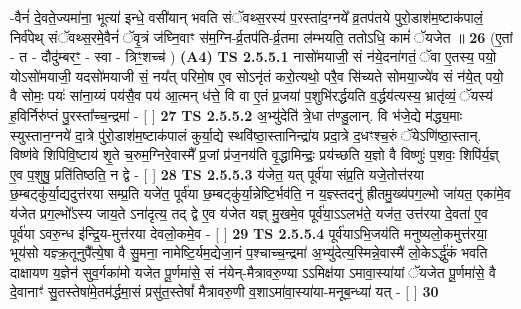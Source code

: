 \documentclass[17pt]{extarticle}
\begin{document}
                  -वैनं॑ दे॒वते॒ज्यमा॑ना॒ भूत्या॑ इन्धे॒ वसी॑यान् भवति संॅवथ्स॒रस्य॑ प॒रस्ता॑द॒ग्नये᳚ व्र॒तप॑तये पुरो॒डाश॑म॒ष्टाक॑पालं॒ निर्व॑पेथ् संॅवथ्स॒रमे॒वैनं॑ ॅवृ॒त्रं ज॑घ्नि॒वाꣳ स॑म॒ग्नि-र्व्र॒तप॑ति-र्व्र॒तमा ल॑म्भयति॒ ततोऽधि॒ कामं॑ ॅयजेत ॥ \textbf{  26 } \newline
                  \newline
                      (ए॒तां - त - दौदु॑म्बरꣳ॒॒ - स्वा - त्रिꣳ॒॒शच्च॑ ) \textbf{(A4)} \newline \newline
                                        \textbf{ TS 2.5.5.1} \newline
                  नासो॑मयाजी॒ सं न॑ये॒दना॑गतं॒ ॅवा ए॒तस्य॒ पयो॒ योऽसो॑मयाजी॒ यदसो॑मयाजी सं॒ नय᳚त् परिमो॒ष ए॒व सोऽनृ॑तं करो॒त्यथो॒ परै॒व सि॑च्यते सोमया॒ज्ये॑व सं न॑ये॒त् पयो॒ वै सोमः॒ पयः॑ सांना॒य्यं पय॑सै॒व पय॑ आ॒त्मन् ध॑त्ते॒ वि वा ए॒तं प्र॒जया॑ प॒शुभि॑रर्द्धयति व॒र्द्धय॑त्यस्य॒ भ्रातृ॑व्यं॒ ॅयस्य॑ ह॒विर्निरु॑प्तं पु॒रस्ता᳚च्च॒न्द्रमा॑ - [  ] \textbf{  27} \newline
                  \newline
                                \textbf{ TS 2.5.5.2} \newline
                  अ॒भ्यु॑देति॑ त्रे॒धा त॑ण्डु॒लान्. वि भ॑जे॒द्ये म॑द्ध्य॒माः स्युस्तान॒ग्नये॑ दा॒त्रे पु॑रो॒डाश॑म॒ष्टाक॑पालं कुर्या॒द्ये स्थवि॑ष्ठा॒स्तानिन्द्रा॑य प्रदा॒त्रे द॒धꣳश्च॒रुं ॅयेऽणि॑ष्ठा॒स्तान्. विष्ण॑वे शिपिवि॒ष्टाय॑ शृ॒ते च॒रुम॒ग्निरे॒वास्मै᳚ प्र॒जां प्र॑ज॒नय॑ति वृ॒द्धामिन्द्रः॒ प्रय॑च्छति य॒ज्ञो वै विष्णुः॑ प॒शवः॒ शिपि॑र्य॒ज्ञ् ए॒व प॒शुषु॒ प्रति॑तिष्ठति॒ न द्वे - [  ] \textbf{  28} \newline
                  \newline
                                \textbf{ TS 2.5.5.3} \newline
                  य॑जेत॒ यत् पूर्व॑या संप्र॒ति यजे॒तोत्त॑रया छ॒म्बट्कु॑र्या॒द्यदुत्त॑रया सम्प्र॒ति यजे॑त॒ पूर्व॑या छ॒म्बट्कु॑र्या॒न्नेष्टि॒र्भव॑ति॒ न य॒ज्ञ्स्तदनु॑ ह्रीतमु॒ख्य॑पग॒ल्भो जा॑यत॒ एका॑मे॒व य॑जेत प्रग॒ल्भो᳚ऽस्य जाय॒ते ऽना॑दृत्य॒ तद् द्वे ए॒व य॑जेत यज्ञ् मु॒खमे॒व पूर्व॑या॒ऽऽलभ॑ते॒ यज॑त॒ उत्त॑रया दे॒वता॑ ए॒व पूर्व॑या ऽवरु॒न्ध इ॑न्द्रि॒य-मुत्त॑रया देवलो॒कमे॒व - [  ] \textbf{  29} \newline
                  \newline
                                \textbf{ TS 2.5.5.4} \newline
                  पूर्व॑याऽभि॒जय॑ति मनुष्यलो॒कमुत्त॑रया॒ भूय॑सो यज्ञ्क्र॒तूनुपै᳚त्ये॒षा वै सु॒मना॒ नामेष्टि॒र्यम॒द्येजा॒नं प॒श्चाच्च॒न्द्रमा॑ अ॒भ्यु॑देत्य॒स्मिन्ने॒वास्मै॑ लो॒केऽर्द्धु॑कं भवति दाक्षायण य॒ज्ञेन॑ सुव॒र्गका॑मो यजेत पू॒र्णमा॑से॒ सं न॑येन्-मैत्रावरु॒ण्या ऽऽमिक्ष॑या ऽमावा॒स्या॑यां ॅयजेत पू॒र्णमा॑से॒ वै दे॒वानाꣳ॑ सु॒तस्तेषा॑मे॒तम॑र्द्धमा॒सं प्रसु॑त॒स्तेषां᳚ मैत्रावरु॒णी व॒शाऽमा॑वा॒स्या॑या-मनूब॒न्ध्या॑ यत् - [  ] \textbf{  30} \newline
\end{document}
